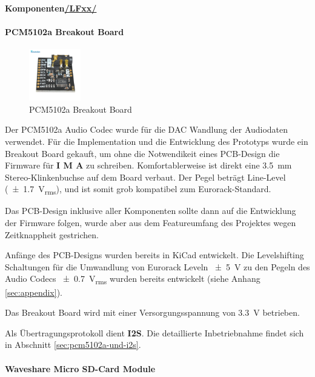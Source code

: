 \newpage

\textbf{Komponenten\hyperlink{}{/LFxx/}} \\

\paragraph{PCM5102a Breakout Board}

\begin{figure} %
	\vspace{-20pt}
	\includegraphics[width=0.2\textwidth]{images/05_technische_spezifikation/audio/pcm5102a_breakout.jpg}
	\caption{PCM5102a Breakout Board}
	\label{fig:pcm5102a_breakout}
\end{figure}

Der PCM5102a Audio Codec wurde für die DAC Wandlung der Audiodaten verwendet. Für die Implementation und die Entwicklung des Prototyps wurde ein Breakout Board gekauft, um ohne die Notwendikeit eines PCB-Design die Firmware für \textbf{I M A} zu schreiben. 
Komfortablerweise ist direkt eine \SI{3,5}{\milli\meter} Stereo-Klinkenbuchse auf dem Board verbaut.
Der Pegel beträgt Line-Level (\SI{\pm 1.7}{\volt_{rms}}), und ist somit grob kompatibel zum Eurorack-Standard.

Das PCB-Design inklusive aller Komponenten sollte dann auf die Entwicklung der Firmware folgen, wurde aber aus dem Featureumfang des Projektes wegen Zeitknappheit gestrichen.

Anfänge des PCB-Designs wurden bereits in KiCad entwickelt.
Die Levelshifting Schaltungen für die Umwandlung von Eurorack Leveln \SI{\pm 5}{\volt} zu den Pegeln des Audio Codecs \SI{\pm 0.7}{\volt_{rms}} wurden bereits entwickelt (siehe Anhang \ref{sec:appendix}).

Das Breakout Board wird mit einer Versorgungsspannung von \SI{3,3}{\volt} betrieben.

Als Übertragungsprotokoll dient \textbf{I2S}. Die detaillierte Inbetriebnahme findet sich in Abschnitt \ref{sec:pcm5102a-und-i2s}.


\paragraph{Waveshare Micro SD-Card Module}

